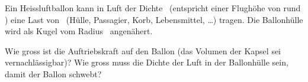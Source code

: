Ein Heissluftballon kann in Luft der Dichte \rhoLaO\ (entspricht einer Flughöhe von rund \hFlO) eine Last von \mLaO\ (Hülle, Passagier, Korb, Lebensmittel, \dots) tragen. Die Ballonhülle wird als Kugel vom Radius \rBO\ angenähert.
\begin{abcliste}
\abc Wie gross ist die Auftriebskraft auf den Ballon (das Volumen der Kapsel sei vernachlässigbar)?
\abc Wie gross muss die Dichte der Luft in der Ballonhülle sein, damit der Ballon schwebt?
\end{abcliste}
